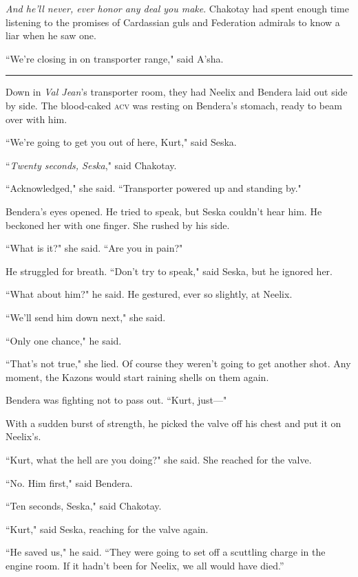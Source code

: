 \documentclass[twoside,letterpaper,12pt]{memoir}
\begin{document}
\textit{And he'll never, ever honor any deal you make}. Chakotay had spent enough time listening to the promises of Cardassian guls and Federation admirals to know a liar when he saw one.

``We're closing in on transporter range," said A'sha.

\begin{center}\rule{3cm}{0.4 pt}\end{center}

Down in \textit{Val Jean}'s transporter room, they had Neelix and Bendera laid out side by side. The blood-caked \textsc{acv} was resting on Bendera's stomach, ready to beam over with him.

``We're going to get you out of here, Kurt," said Seska.

``\textit{Twenty seconds, Seska}," said Chakotay.

``Acknowledged," she said. ``Transporter powered up and standing by."

Bendera's eyes opened. He tried to speak, but Seska couldn't hear him. He beckoned her with one finger. She rushed by his side.

``What is it?" she said. ``Are you in pain?"

He struggled for breath. ``Don't try to speak," said Seska, but he ignored her.

``What about him?" he said. He gestured, ever so slightly, at Neelix.

``We'll send him down next," she said.

``Only one chance," he said.

``That's not true," she lied. Of course they weren't going to get another shot. Any moment, the Kazons would start raining shells on them again.

Bendera was fighting not to pass out. ``Kurt, just---"

With a sudden burst of strength, he picked the valve off his chest and put it on Neelix's.

``Kurt, what the hell are you doing?" she said. She reached for the valve.

``No. Him first," said Bendera.

``Ten seconds, Seska," said Chakotay.

``Kurt," said Seska, reaching for the valve again.

``He saved us," he said. “They were going to set off a scuttling charge in the engine room. If it hadn't been for Neelix, we all would have died.”
\end{document}
